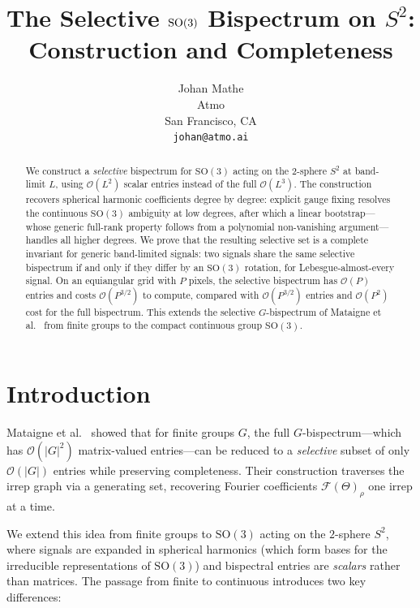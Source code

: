 \documentclass{article}
\title{The Selective $\SO(3)$ Bispectrum on $S^2$:\\
Construction and Completeness}
\author{%
  Johan Mathe \\
  Atmo \\
  San Francisco, CA \\
  \texttt{johan@atmo.ai}
}
\theoremstyle{plain}
\theoremstyle{definition}
\theoremstyle{remark}
\newcommand{\SO}{\mathrm{SO}}
\begin{document}
\maketitle

\begin{abstract}
We construct a \emph{selective} bispectrum for $\SO(3)$ acting on the
$2$-sphere $S^2$ at band-limit $L$, using $\mathcal{O}(L^2)$ scalar
entries instead of the full $\mathcal{O}(L^3)$.
The construction recovers spherical harmonic coefficients degree by
degree: explicit gauge fixing resolves the continuous $\SO(3)$ ambiguity
at low degrees, after which a linear bootstrap---whose generic
full-rank property follows from a polynomial non-vanishing
argument---handles all higher degrees.
We prove that the resulting selective set is a complete invariant for
generic band-limited signals: two signals share the same selective
bispectrum if and only if they differ by an $\SO(3)$ rotation, for
Lebesgue-almost-every signal.
On an equiangular grid with $P$ pixels, the selective bispectrum
has $\mathcal{O}(P)$ entries and costs $\mathcal{O}(P^{3/2})$ to
compute, compared with $\mathcal{O}(P^{3/2})$ entries and
$\mathcal{O}(P^2)$ cost for the full bispectrum.
This extends the selective $G$-bispectrum of Mataigne et
al.~\cite{mataigne2024} from finite groups to the compact continuous
group $\SO(3)$.
\end{abstract}

\section{Introduction}\label{sec:introduction}

Mataigne et al.~\cite{mataigne2024} showed that for finite groups $G$,
the full $G$-bispectrum---which has $\mathcal{O}(|G|^2)$ matrix-valued
entries---can be reduced to a \emph{selective} subset of only
$\mathcal{O}(|G|)$ entries while preserving completeness. Their
construction traverses the irrep graph via a generating set, recovering
Fourier coefficients $\mathcal{F}(\Theta)_\rho$ one irrep at a time.

We extend this idea from finite groups to $\SO(3)$ acting on the
$2$-sphere $S^2$, where signals are expanded in spherical harmonics
(which form bases for the irreducible representations of $\SO(3)$) and bispectral entries are \emph{scalars}
rather than matrices. The passage from finite to continuous introduces
two key differences:
\end{document}
